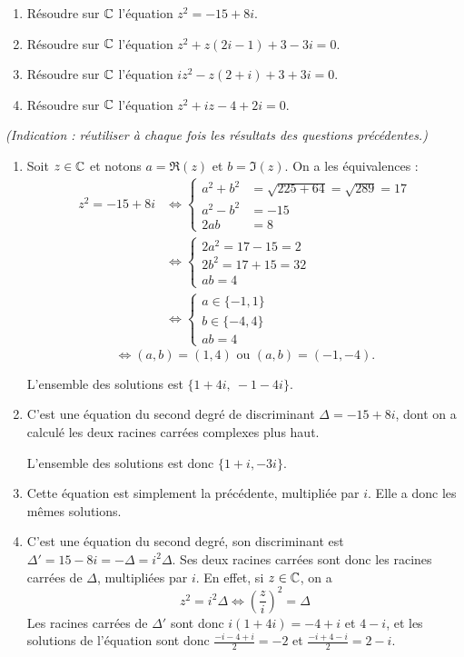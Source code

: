 \begin{exo}

\begin{enumerate}
\item Résoudre sur $\mathbb{C}$ l'équation $z^2=-15+8i$.
\item Résoudre sur $\mathbb{C}$ l'équation $z^2+z(2i-1)+3-3i=0$.
\item Résoudre sur $\mathbb{C}$ l'équation $iz^2-z(2+i)+3+3i=0$.
\item Résoudre sur $\mathbb{C}$ l'équation $z^2+iz-4+2i=0$.
\end{enumerate}
\emph{(Indication : réutiliser à chaque fois les résultats des questions précédentes.)}
\begin{sol}
\begin{enumerate}
\item Soit $z\in \mathbb{C}$ et notons $a=\Re(z)$ et $b=\Im(z)$. On a les équivalences : 
\begin{align*}
z^2 =-15+8i
&\iff 
\begin{cases}
a^2+b^2&=\sqrt{225+64}=\sqrt{289}=17\\
a^2-b^2&= -15\\
2ab&= 8
\end{cases}\\
&\iff \begin{cases}2a^2=17-15=2\\ 2b^2=17+15=32\\ab=4\end{cases}\\
&\iff \begin{cases}a\in \{-1,1\}\\b\in \{-4,4\}\\ab=4\end{cases}
\end{align*}
\[\iff (a,b)=(1,4) \text{ ou } (a,b)=(-1,-4).\]
\begin{mdframed}
L'ensemble des solutions est $\{1+4i, \: -1-4i\}$.\end{mdframed}
\item C'est une équation du second degré de discriminant $\Delta=-15+8i$, dont on a calculé les deux racines carrées complexes plus haut. \begin{mdframed}L'ensemble des solutions est donc
$\{1+i,-3i\}$.\end{mdframed}
\item Cette équation est simplement la précédente, multipliée par $i$. Elle a donc les mêmes solutions.
\item C'est une équation du second degré, son discriminant est $\Delta'=15-8i=-\Delta=i^2\Delta$. Ses deux racines carrées sont donc les racines carrées de $\Delta$, multipliées par $i$. En effet, si $z\in \mathbb{C}$, on a 
\[ z^2=i^2\Delta \iff \left(\frac{z}{i}\right)^2=\Delta\]
Les racines carrées de $\Delta'$ sont donc $i(1+4i)=-4+i$ et $4-i$, et les solutions de l'équation sont donc $\frac{-i-4+i}{2} = -2$ et $\frac{-i+4-i}{2}=2-i$.
\end{enumerate}
\end{sol}
\end{exo}



